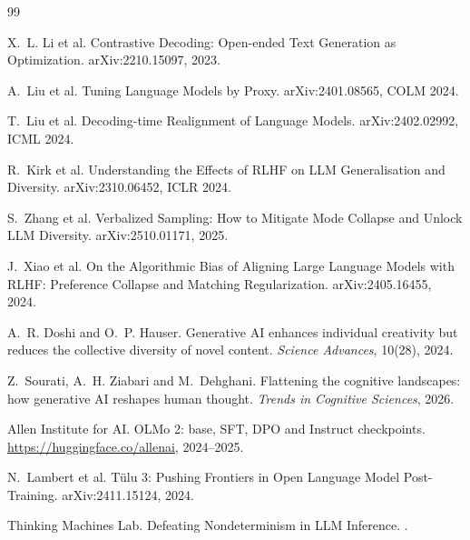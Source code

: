 \documentclass[11pt]{article}
\begin{document}
\begin{thebibliography}{99}

X.~L. Li et al.
\newblock Contrastive Decoding: Open-ended Text Generation as Optimization.
\newblock arXiv:2210.15097, 2023.

A.~Liu et al.
\newblock Tuning Language Models by Proxy.
\newblock arXiv:2401.08565, COLM 2024.

T.~Liu et al.
\newblock Decoding-time Realignment of Language Models.
\newblock arXiv:2402.02992, ICML 2024.

R.~Kirk et al.
\newblock Understanding the Effects of RLHF on LLM Generalisation and Diversity.
\newblock arXiv:2310.06452, ICLR 2024.

S.~Zhang et al.
\newblock Verbalized Sampling: How to Mitigate Mode Collapse and Unlock LLM
Diversity.
\newblock arXiv:2510.01171, 2025.

J.~Xiao et al.
\newblock On the Algorithmic Bias of Aligning Large Language Models with RLHF:
Preference Collapse and Matching Regularization.
\newblock arXiv:2405.16455, 2024.

A.~R. Doshi and O.~P. Hauser.
\newblock Generative AI enhances individual creativity but reduces the collective
diversity of novel content.
\newblock \emph{Science Advances}, 10(28), 2024.

Z.~Sourati, A.~H. Ziabari and M.~Dehghani.
\newblock Flattening the cognitive landscapes: how generative AI reshapes human
thought.
\newblock \emph{Trends in Cognitive Sciences}, 2026.

Allen Institute for AI.
\newblock OLMo 2: base, SFT, DPO and Instruct checkpoints.
\newblock \url{https://huggingface.co/allenai}, 2024--2025.

N.~Lambert et al.
\newblock T\"ulu 3: Pushing Frontiers in Open Language Model Post-Training.
\newblock arXiv:2411.15124, 2024.

Thinking Machines Lab.
\newblock Defeating Nondeterminism in LLM Inference.
.

\end{thebibliography}
\end{document}
